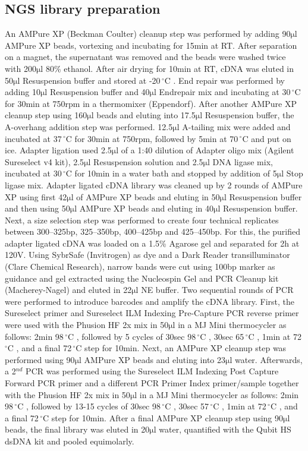 \documentclass[10pt]{article}
\newcommand{\mul}{\ensuremath{\mathrm{\mu l}} }
\newcommand{\C}{\,$^{\circ}\mathrm{C}$ }
\begin{document}
\subsection*{NGS library preparation}

An AMPure XP (Beckman Coulter) cleanup step was performed by adding 90\mul AMPure XP beads, vortexing and incubating for 15min at RT. After separation on a magnet, the supernatant was removed and the beads were washed twice with 200\mul 80\% ethanol. After air drying for 10min at RT, cDNA was eluted in 50\mul Resuspension buffer and stored at -20\C.
End repair was performed by adding 10\mul Resuspension buffer and 40\mul Endrepair mix and incubating at 30\C for 30min at 750rpm in a thermomixer (Eppendorf).
After another AMPure XP cleanup step using 160\mul beads and eluting into 17.5\mul Resuspension buffer, the A-overhang addition step was performed. 12.5\mul A-tailing mix were added and incubated at 37\C for 30min at 750rpm, followed by 5min at 70\C and put on ice. Adapter ligation used 2.5\mul of a 1:40 dilution of Adapter oligo mix (Agilent Sureselect v4 kit), 2.5\mul Resuspension solution and 2.5\mul DNA ligase mix, incubated at 30\C for 10min in a water bath and stopped by addition of 5\mul Stop ligase mix. Adapter ligated cDNA library was cleaned up by 2 rounds of AMPure XP using first 42\mul of AMPure XP beads and eluting in 50\mul Resuspension buffer and then using 50\mul AMPure XP beads and eluting in 40\mul Resuspension buffer.
Next, a size selection step was performed to create four technical replicates between 300--325bp, 325--350bp, 400--425bp and 425--450bp. For this, the purified adapter ligated cDNA was loaded on a 1.5\% Agarose gel and separated for 2h at 120V. Using SybrSafe (Invitrogen) as dye and a Dark Reader transilluminator (Clare Chemical Research), narrow bands were cut using 100bp marker as guidance and gel extracted using the Nucleospin Gel and PCR Cleanup kit (Macherey-Nagel) and eluted in 22\mul NE buffer.
Two sequential rounds of PCR were performed to introduce barcodes and amplify the cDNA library. First, the Sureselect primer and Sureselect ILM Indexing Pre-Capture PCR reverse primer were used with the Phusion HF 2x mix in 50\mul in a MJ Mini thermocycler as follows: 2min 98\C, followed by 5 cycles of 30sec 98\C, 30sec 65\C, 1min at 72\C, and a final 72\C step for 10min. Next, an AMPure XP cleanup step was performed using 90\mul AMPure XP beads and eluting into 23\mul water. Afterwards, a 2$^{nd}$ PCR was performed using the Sureselect ILM Indexing Post Capture Forward PCR primer and a different PCR Primer Index primer/sample together with the Phusion HF 2x mix in 50\mul in a MJ Mini thermocycler as follows: 2min 98\C, followed by 13-15 cycles of 30sec 98\C, 30sec 57\C, 1min at 72\C, and a final 72\C step for 10min. After a final AMPure XP cleanup step using 90\mul beads, the final library was eluted in 20\mul water, quantified with the Qubit HS dsDNA kit and pooled equimolarly.
\end{document}
